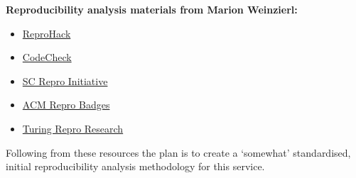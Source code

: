 \textbf{Reproducibility analysis materials from Marion Weinzierl:}
\begin{itemize}
    \item \href{https://www.reprohack.org/}{ReproHack}
    \item \href{https://codecheck.org.uk/}{CodeCheck}
    \item \href{https://sc24.supercomputing.org/program/papers/reproducibility-initiative/}{SC Repro Initiative}
    \item \href{https://www.acm.org/publications/policies/artifact-review-and-badging-current}{ACM Repro Badges}
    \item \href{https://book.the-turing-way.org/reproducible-research/reproducible-research}{Turing Repro Research}
\end{itemize}
Following from these resources the plan is to create a `somewhat' standardised, initial reproducibility analysis methodology for this service.